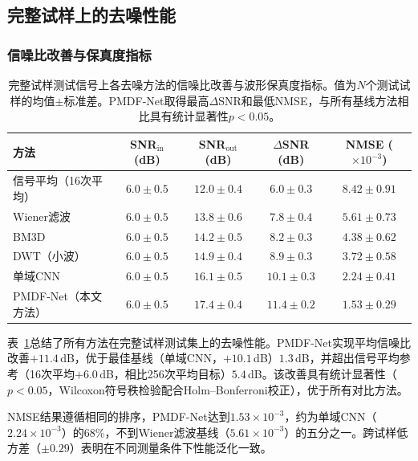 \subsection{完整试样上的去噪性能}
\label{sec:results-denoising}

\subsubsection{信噪比改善与保真度指标}

\begin{table}[htbp]
\centering
\caption{完整试样测试信号上各去噪方法的信噪比改善与波形保真度指标。值为$N$个测试试样的均值$\pm$标准差。PMDF-Net取得最高$\Delta$SNR和最低NMSE，与所有基线方法相比具有统计显著性$p < 0.05$。}
\label{tab:denoising-metrics}
\begin{tabular}{lcccc}
\toprule
方法 & SNR$_{\text{in}}$ (dB) & SNR$_{\text{out}}$ (dB) & $\Delta$SNR (dB) & NMSE ($\times 10^{-3}$) \\
\midrule
信号平均（16次平均） & $6.0 \pm 0.5$ & $12.0 \pm 0.4$ & $6.0 \pm 0.3$ & $8.42 \pm 0.91$ \\
Wiener滤波 & $6.0 \pm 0.5$ & $13.8 \pm 0.6$ & $7.8 \pm 0.4$ & $5.61 \pm 0.73$ \\
BM3D & $6.0 \pm 0.5$ & $14.2 \pm 0.5$ & $8.2 \pm 0.3$ & $4.38 \pm 0.62$ \\
DWT（小波） & $6.0 \pm 0.5$ & $14.9 \pm 0.4$ & $8.9 \pm 0.3$ & $3.72 \pm 0.58$ \\
单域CNN & $6.0 \pm 0.5$ & $16.1 \pm 0.5$ & $10.1 \pm 0.3$ & $2.24 \pm 0.41$ \\
PMDF-Net（本文方法） & $6.0 \pm 0.5$ & $17.4 \pm 0.4$ & $\mathbf{11.4 \pm 0.2}$ & $\mathbf{1.53 \pm 0.29}$ \\
\bottomrule
\end{tabular}
\end{table}

表~\ref{tab:denoising-metrics}总结了所有方法在完整试样测试集上的去噪性能。PMDF-Net实现平均信噪比改善$+11.4$\,dB，优于最佳基线（单域CNN，$+10.1$\,dB）$1.3$\,dB，并超出信号平均参考（16次平均$+6.0$\,dB，相比256次平均目标）$5.4$\,dB。该改善具有统计显著性（$p < 0.05$，Wilcoxon符号秩检验配合Holm--Bonferroni校正），优于所有对比方法。

NMSE结果遵循相同的排序，PMDF-Net达到$1.53 \times 10^{-3}$，约为单域CNN（$2.24 \times 10^{-3}$）的68\%，不到Wiener滤波基线（$5.61 \times 10^{-3}$）的五分之一。跨试样低方差（$\pm 0.29$）表明在不同测量条件下性能泛化一致。

